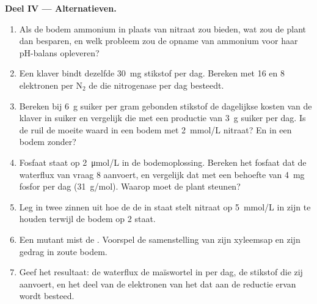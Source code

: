 \begin{problem}
\medskip
\noindent\textbf{Deel IV --- Alternatieven.}
\begin{enumerate}[resume]
  \item Als de bodem ammonium in plaats van nitraat zou bieden, wat zou
        de plant dan besparen, en welk probleem zou de opname van
        ammonium voor haar pH-balans opleveren?
  \item Een klaver bindt dezelfde \qty{30}{mg} stikstof per dag. Bereken
        met \qty{16}{}  en \qty{8}{} elektronen per $\mathrm{N_2}$ de
         die nitrogenase per dag besteedt.
  \item Bereken bij \qty{6}{g} suiker per gram gebonden stikstof de
        dagelijkse kosten van de klaver in suiker en vergelijk die met een
        productie van \qty{3}{g} suiker per dag. Is de ruil de moeite
        waard in een bodem met \qty{2}{mmol/L} nitraat? En in een bodem
        zonder?
  \item Fosfaat staat op \qty{2}{\micro mol/L} in de bodemoplossing.
        Bereken het fosfaat dat de waterflux van vraag 8 aanvoert, en
        vergelijk dat met een behoefte van \qty{4}{mg} fosfor per dag
        (\qty{31}{g/mol}). Waarop moet de plant steunen?
  \item Leg in twee zinnen uit hoe de  de  in staat
        stelt nitraat op \qty{5}{mmol/L} in zijn  te houden terwijl
        de bodem op \qty{2}{} staat.
  \item Een mutant mist de . Voorspel de samenstelling van
        zijn xyleemsap en zijn gedrag in zoute bodem.
  \item Geef het resultaat: de waterflux de maïswortel in per dag, de
        stikstof die zij aanvoert, en het deel van de elektronen van het
         dat aan de reductie ervan wordt besteed.
\end{enumerate}
\end{problem}
